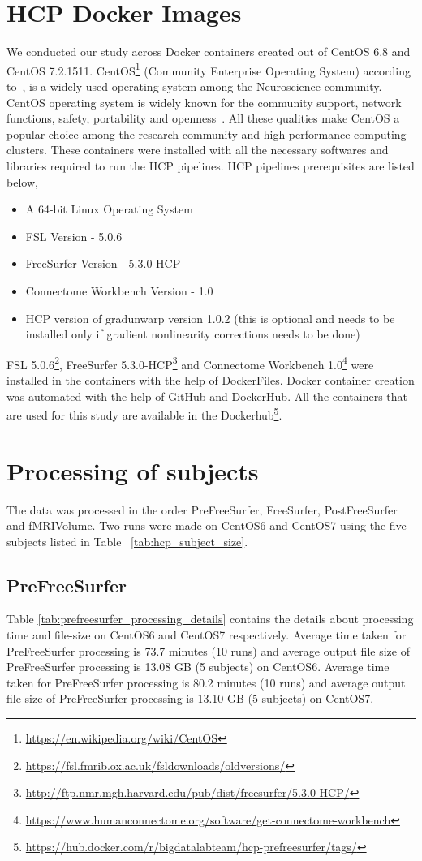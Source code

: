 \section{HCP Docker Images}
We conducted our study across Docker containers created out of CentOS 6.8 and CentOS 7.2.1511. CentOS\footnote{\url{https://en.wikipedia.org/wiki/CentOS}} (Community Enterprise Operating System) according to~\cite{CentOS}, is a widely used operating system among the Neuroscience community. CentOS operating system is widely known for the community support, network functions, safety, portability and openness~\cite{5665431}. All these qualities make CentOS a popular choice among the research community and high performance computing clusters.
These containers were installed with all the necessary softwares and libraries required to run the HCP pipelines. HCP pipelines prerequisites are listed below,
\begin{itemize}
\item A 64-bit Linux Operating System
\item FSL Version - 5.0.6
\item FreeSurfer Version - 5.3.0-HCP
\item Connectome Workbench Version - 1.0 
\item HCP version of gradunwarp version 1.0.2 (this is optional and needs to be installed only if gradient nonlinearity corrections needs to be done)
\end{itemize}
FSL 5.0.6\footnote{\url{https://fsl.fmrib.ox.ac.uk/fsldownloads/oldversions/}}, FreeSurfer 5.3.0-HCP\footnote{\url{http://ftp.nmr.mgh.harvard.edu/pub/dist/freesurfer/5.3.0-HCP/}} and Connectome Workbench 1.0\footnote{\url{https://www.humanconnectome.org/software/get-connectome-workbench}} were installed in the containers with the help of DockerFiles.
Docker container creation was automated with the help of GitHub and DockerHub. All the containers that are used for this study are available in the Dockerhub\footnote{\url{https://hub.docker.com/r/bigdatalabteam/hcp-prefreesurfer/tags/}}.

\section{Processing of subjects} \label{processing_subjects}
The data was processed in the order PreFreeSurfer, FreeSurfer, PostFreeSurfer and fMRIVolume. Two runs were made on CentOS6 and CentOS7 using the five subjects listed in Table ~\ref{tab:hcp_subject_size}.
\subsection{PreFreeSurfer}
Table \ref{tab:prefreesurfer_processing_details} contains the details about processing time and file-size on CentOS6 and CentOS7 respectively.
Average time taken for PreFreeSurfer processing is 73.7 minutes (10 runs) and average output file size of PreFreeSurfer processing is 13.08 GB (5 subjects) on CentOS6.
Average time taken for PreFreeSurfer processing is 80.2 minutes (10 runs) and average output file size of PreFreeSurfer processing is 13.10 GB (5 subjects) on CentOS7.

